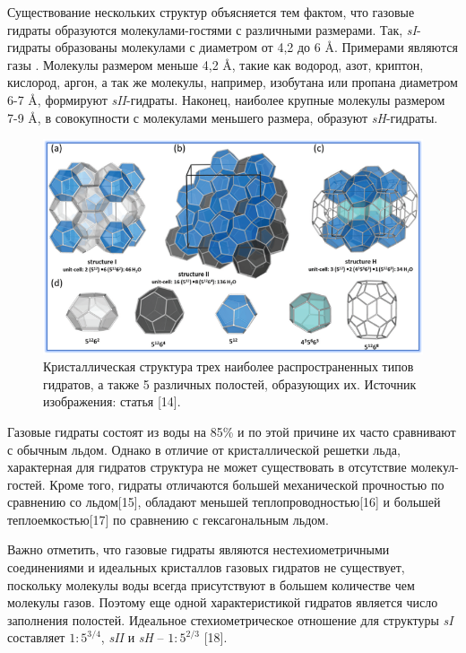 \par Существование нескольких структур объясняется тем фактом, что газовые гидраты образуются молекулами-гостями с различными размерами. Так, \textit{sI}-гидраты образованы молекулами с диаметром от 4,2 до 6 \si{\angstrom}. Примерами являются газы . Молекулы размером меньше 4,2 \si{\angstrom}, такие как водород, азот, криптон, кислород, аргон, а так же молекулы, например, изобутана или пропана диаметром 6-7 \si{\angstrom}, формируют \textit{sII}-гидраты. Наконец, наиболее крупные молекулы размером 7-9 \si{\angstrom}, в совокупности с молекулами меньшего размера, образуют \textit{sH}-гидраты.

\begin{figure}[H]
    \centering
    \includegraphics[width=.9\linewidth]{figures/hydrstruct.png}
    \caption{Кристаллическая структура трех наиболее распространенных типов гидратов, а также 5 различных полостей, образующих их. Источник изображения: статья [14].}
    \label{fig1.2.1}
\end{figure}

\par Газовые гидраты состоят из воды на 85\% и по этой причине их часто сравнивают с обычным льдом. Однако в отличие от кристаллической решетки льда, характерная для гидратов структура не может существовать в отсутствие молекул-гостей. Кроме того, гидраты отличаются большей механической прочностью по сравнению со льдом[15], обладают меньшей теплопроводностью[16] и большей теплоемкостью[17] по сравнению с гексагональным льдом.

\par Важно отметить, что газовые гидраты являются нестехиометричными соединениями и идеальных кристаллов газовых гидратов не существует, поскольку молекулы воды всегда присутствуют в большем  количестве чем молекулы газов. Поэтому еще одной характеристикой гидратов является число заполнения полостей. Идеальное стехиометрическое отношение для структуры \textit{sI} составляет $1:5^{3/4}$, \textit{sII} и \textit{sH} -- $1:5^{2/3}$ [18].

